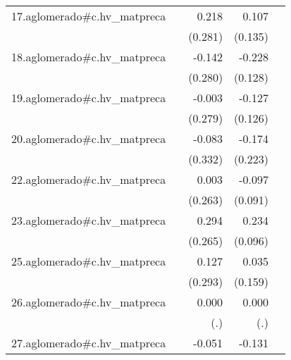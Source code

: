 {\begin{longtable}{l*{4}{D{.}{.}{-1}}}
\addlinespace
17.aglomerado#c.hv\_matpreca&                     &       0.218         &       0.107         &                     \\
            &                     &     (0.281)         &     (0.135)         &                     \\
\addlinespace
18.aglomerado#c.hv\_matpreca&                     &      -0.142         &      -0.228         &                     \\
            &                     &     (0.280)         &     (0.128)         &                     \\
\addlinespace
19.aglomerado#c.hv\_matpreca&                     &      -0.003         &      -0.127         &                     \\
            &                     &     (0.279)         &     (0.126)         &                     \\
\addlinespace
20.aglomerado#c.hv\_matpreca&                     &      -0.083         &      -0.174         &                     \\
            &                     &     (0.332)         &     (0.223)         &                     \\
\addlinespace
22.aglomerado#c.hv\_matpreca&                     &       0.003         &      -0.097         &                     \\
            &                     &     (0.263)         &     (0.091)         &                     \\
\addlinespace
23.aglomerado#c.hv\_matpreca&                     &       0.294         &       0.234\sym{*}  &                     \\
            &                     &     (0.265)         &     (0.096)         &                     \\
\addlinespace
25.aglomerado#c.hv\_matpreca&                     &       0.127         &       0.035         &                     \\
            &                     &     (0.293)         &     (0.159)         &                     \\
\addlinespace
26.aglomerado#c.hv\_matpreca&                     &       0.000         &       0.000         &                     \\
            &                     &         (.)         &         (.)         &                     \\
\addlinespace
27.aglomerado#c.hv\_matpreca&                     &      -0.051         &      -0.131\sym{**} &                     \\

\end{longtable}}
